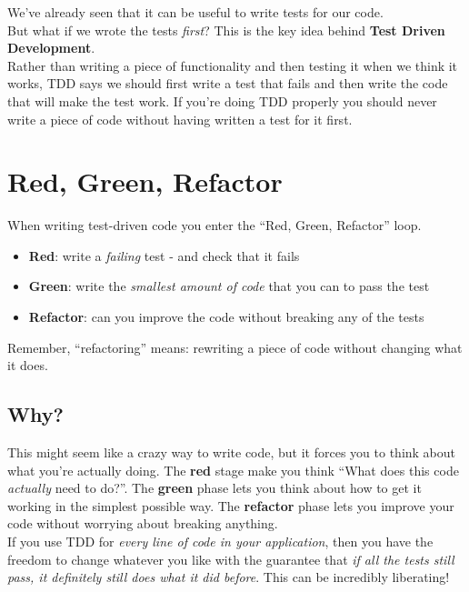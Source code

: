 We've already seen that it can be useful to write tests for our code.
\\

But what if we wrote the tests \textit{first}? This is the key idea behind \textbf{Test Driven Development}.
\\

Rather than writing a piece of functionality and then testing it when we think it works, TDD says we should first write a test that fails and then write the code that will make the test work. If you're doing TDD properly you should never write a piece of code without having written a test for it first.

\section{Red, Green, Refactor}

When writing test-driven code you enter the ``Red, Green, Refactor'' loop.

\begin{itemize}
    \item \textbf{Red}: write a \textit{failing} test - and check that it fails
    \item \textbf{Green}: write the \textit{smallest amount of code} that you can to pass the test
    \item \textbf{Refactor}: can you improve the code without breaking any of the tests
\end{itemize}

Remember, ``refactoring'' means: rewriting a piece of code without changing what it does.

\subsection{Why?}

This might seem like a crazy way to write code, but it forces you to think about what you're actually doing. The \textbf{red} stage make you think ``What does this code \textit{actually} need to do?''. The \textbf{green} phase lets you think about how to get it working in the simplest possible way. The \textbf{refactor} phase lets you improve your code without worrying about breaking anything.
\\

If you use TDD for \textit{every line of code in your application}, then you have the freedom to change whatever you like with the guarantee that \textit{if all the tests still pass, it definitely still does what it did before}. This can be incredibly liberating!
\\


